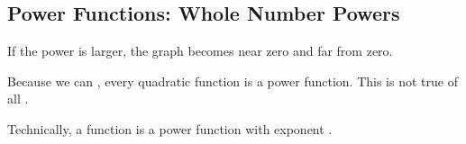 \subsection{Power Functions: Whole Number Powers} 
\begin{Note}
If the power is larger, the graph becomes \makeblank[1in] near zero and \makeblank[1in] far from zero.
\end{Note}
\begin{Note}
Because we can \makeblank, every quadratic function is a power function. This is not true of all \makeblank[1.5in].
\end{Note}
\begin{Note}
Technically, a \makeblank[1in] function is a power function with exponent \makeblanksmall.
\end{Note}